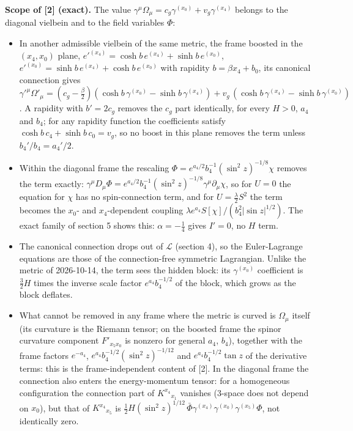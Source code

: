 \documentclass[11pt]{article}
\begin{document}
\textbf{Scope of [2] (exact).} The value $\gamma^\mu\Omega_\mu = c_g\gamma^{(x_0)} + v_g\gamma^{(x_4)}$ belongs to the diagonal vielbein and to the field variables $\Phi$:

\begin{itemize}
\item In another admissible vielbein of the same metric, the frame boosted in the $(x_4, x_0)$ plane, $e'^{(x_4)} = \cosh b\,e^{(x_4)} + \sinh b\,e^{(x_0)}$, $e'^{(x_0)} = \sinh b\,e^{(x_4)} + \cosh b\,e^{(x_0)}$ with rapidity $b = \beta x_4 + b_0$, its canonical connection gives $\gamma'^\mu\Omega'_\mu = (c_g - \tfrac{\beta}{2})(\cosh b\,\gamma^{(x_0)} - \sinh b\,\gamma^{(x_4)}) + v_g\,(\cosh b\,\gamma^{(x_4)} - \sinh b\,\gamma^{(x_0)})$. A rapidity with $b' = 2c_g$ removes the $c_g$ part identically, for every $H > 0$, $a_4$ and $b_4$; for any rapidity function the coefficients satisfy $\cosh b\,c_4 + \sinh b\,c_0 = v_g$, so no boost in this plane removes the term unless $b_4'/b_4 = a_4'/2$.
\item Within the diagonal frame the rescaling $\Phi = e^{a_4/2}b_4^{-1}(\sin^2 z)^{-1/8}\chi$ removes the term exactly: $\gamma^\mu D_\mu\Phi = e^{a_4/2}b_4^{-1}(\sin^2 z)^{-1/8}\gamma^\mu\partial_\mu\chi$, so for $U = 0$ the equation for $\chi$ has no spin-connection term, and for $U = \tfrac{\lambda}{2}S^2$ the term becomes the $x_0$- and $x_4$-dependent coupling $\lambda e^{a_4}S[\chi]/(b_4^2|\sin z|^{1/2})$. The exact family of section 5 shows this: $\alpha = -\tfrac14$ gives $I' = 0$, no $H$ term.
\item The canonical connection drops out of $\mathcal{L}$ (section 4), so the Euler-Lagrange equations are those of the connection-free symmetric Lagrangian. Unlike the metric of 2026-10-14, the term sees the hidden block: its $\gamma^{(x_0)}$ coefficient is $\tfrac32H$ times the inverse scale factor $e^{a_4}b_4^{-1/2}$ of the block, which grows as the block deflates.
\item What cannot be removed in any frame where the metric is curved is $\Omega_\mu$ itself (its curvature is the Riemann tensor; on the boosted frame the spinor curvature component $F'_{x_5x_0}$ is nonzero for general $a_4$, $b_4$), together with the frame factors $e^{-a_4}$, $e^{a_4}b_4^{-1/2}(\sin^2 z)^{-1/12}$ and $e^{a_4}b_4^{-1/2}\tan z$ of the derivative terms: this is the frame-independent content of [2]. In the diagonal frame the connection also enters the energy-momentum tensor: for a homogeneous configuration the connection part of $K^{x_4}{}_{x_1}$ vanishes (3-space does not depend on $x_0$), but that of $K^{x_4}{}_{x_5}$ is $\tfrac12H(\sin^2 z)^{1/12}\,\bar\Phi\gamma^{(x_4)}\gamma^{(x_0)}\gamma^{(x_5)}\Phi$, not identically zero.

\end{itemize}
\end{document}
